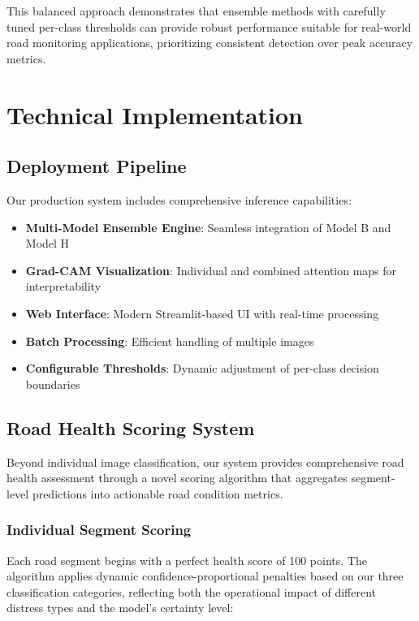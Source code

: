 \documentclass[12pt]{article}
\begin{document}
This balanced approach demonstrates that ensemble methods with carefully tuned per-class thresholds can provide robust performance suitable for real-world road monitoring applications, prioritizing consistent detection over peak accuracy metrics.

\section{Technical Implementation}

\subsection{Deployment Pipeline}

Our production system includes comprehensive inference capabilities:

\begin{itemize}[itemsep=1pt,parsep=0pt,topsep=3pt]
\item \textbf{Multi-Model Ensemble Engine}: Seamless integration of Model B and Model H
\item \textbf{Grad-CAM Visualization}: Individual and combined attention maps for interpretability
\item \textbf{Web Interface}: Modern Streamlit-based UI with real-time processing
\item \textbf{Batch Processing}: Efficient handling of multiple images
\item \textbf{Configurable Thresholds}: Dynamic adjustment of per-class decision boundaries
\end{itemize}

\subsection{Road Health Scoring System}

Beyond individual image classification, our system provides comprehensive road health assessment through a novel scoring algorithm that aggregates segment-level predictions into actionable road condition metrics.

\subsubsection{Individual Segment Scoring}

Each road segment begins with a perfect health score of 100 points. The algorithm applies dynamic confidence-proportional penalties based on our three classification categories, reflecting both the operational impact of different distress types and the model's certainty level:
\end{document}
